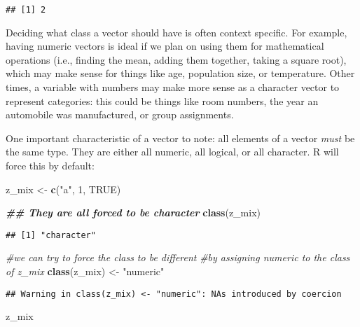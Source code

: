 \documentclass[
]{article}
\newenvironment{Shaded}{\begin{snugshade}}{\end{snugshade}}
\newcommand{\CommentTok}[1]{\textcolor[rgb]{0.56,0.35,0.01}{\textit{#1}}}
\newcommand{\ConstantTok}[1]{\textcolor[rgb]{0.56,0.35,0.01}{#1}}
\newcommand{\DecValTok}[1]{\textcolor[rgb]{0.00,0.00,0.81}{#1}}
\newcommand{\DocumentationTok}[1]{\textcolor[rgb]{0.56,0.35,0.01}{\textbf{\textit{#1}}}}
\newcommand{\FunctionTok}[1]{\textcolor[rgb]{0.13,0.29,0.53}{\textbf{#1}}}
\newcommand{\NormalTok}[1]{#1}
\newcommand{\OtherTok}[1]{\textcolor[rgb]{0.56,0.35,0.01}{#1}}
\newcommand{\StringTok}[1]{\textcolor[rgb]{0.31,0.60,0.02}{#1}}
\begin{document}
\begin{verbatim}
## [1] 2
\end{verbatim}

Deciding what class a vector should have is often context specific. For
example, having numeric vectors is ideal if we plan on using them for
mathematical operations (i.e., finding the mean, adding them together,
taking a square root), which may make sense for things like age,
population size, or temperature. Other times, a variable with numbers
may make more sense as a character vector to represent categories: this
could be things like room numbers, the year an automobile was
manufactured, or group assignments.

One important characteristic of a vector to note: all elements of a
vector \emph{must} be the same type. They are either all numeric, all
logical, or all character. R will force this by default:

\begin{Shaded}
\begin{Highlighting}[]
\NormalTok{z\_mix }\OtherTok{\textless{}{-}} \FunctionTok{c}\NormalTok{(}\StringTok{"a"}\NormalTok{, }\DecValTok{1}\NormalTok{, }\ConstantTok{TRUE}\NormalTok{)}

\DocumentationTok{\#\# They are all forced to be character}
\FunctionTok{class}\NormalTok{(z\_mix)}
\end{Highlighting}
\end{Shaded}

\begin{verbatim}
## [1] "character"
\end{verbatim}

\begin{Shaded}
\begin{Highlighting}[]
\CommentTok{\#we can try to force the class to be different }
\CommentTok{\#by assigning numeric to the class of z\_mix}
\FunctionTok{class}\NormalTok{(z\_mix) }\OtherTok{\textless{}{-}} \StringTok{"numeric"}
\end{Highlighting}
\end{Shaded}

\begin{verbatim}
## Warning in class(z_mix) <- "numeric": NAs introduced by coercion
\end{verbatim}

\begin{Shaded}
\begin{Highlighting}[]
\NormalTok{z\_mix}
\end{Highlighting}
\end{Shaded}
\end{document}

